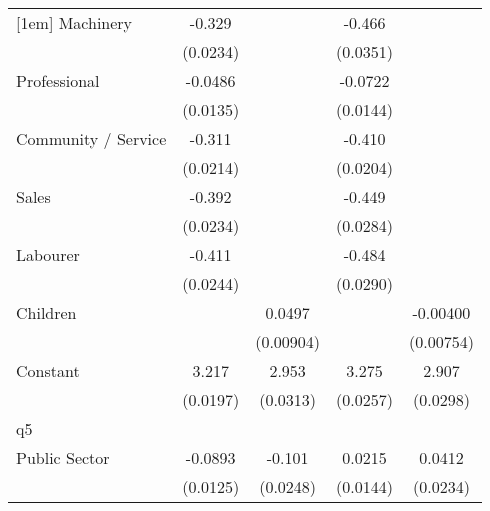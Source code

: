 {\begin{tabular}{l*{4}{c}}
[1em]
Machinery           &      -0.329\sym{***}&                     &      -0.466\sym{***}&                     \\
                    &    (0.0234)         &                     &    (0.0351)         &                     \\
[1em]
Professional        &     -0.0486\sym{***}&                     &     -0.0722\sym{***}&                     \\
                    &    (0.0135)         &                     &    (0.0144)         &                     \\
[1em]
Community / Service &      -0.311\sym{***}&                     &      -0.410\sym{***}&                     \\
                    &    (0.0214)         &                     &    (0.0204)         &                     \\
[1em]
Sales               &      -0.392\sym{***}&                     &      -0.449\sym{***}&                     \\
                    &    (0.0234)         &                     &    (0.0284)         &                     \\
[1em]
Labourer            &      -0.411\sym{***}&                     &      -0.484\sym{***}&                     \\
                    &    (0.0244)         &                     &    (0.0290)         &                     \\
[1em]
Children            &                     &      0.0497\sym{***}&                     &    -0.00400         \\
                    &                     &   (0.00904)         &                     &   (0.00754)         \\
[1em]
Constant            &       3.217\sym{***}&       2.953\sym{***}&       3.275\sym{***}&       2.907\sym{***}\\
                    &    (0.0197)         &    (0.0313)         &    (0.0257)         &    (0.0298)         \\
\hline
q5                  &                     &                     &                     &                     \\
Public Sector       &     -0.0893\sym{***}&      -0.101\sym{***}&      0.0215         &      0.0412         \\
                    &    (0.0125)         &    (0.0248)         &    (0.0144)         &    (0.0234)         \\

\end{tabular}}
